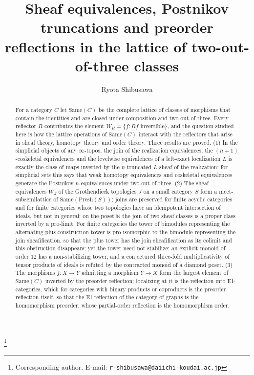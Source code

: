 \documentclass[11pt]{amsart}
\theoremstyle{definition}
\newcommand{\Same}{\mathrm{Same}}
\newcommand{\Presh}{\mathrm{Presh}}
\begin{document}
\title[Sheaves, truncations and reflections in the sameness lattice]{Sheaf equivalences, Postnikov truncations and preorder reflections in the lattice of two-out-of-three classes}
\author{Ryota Shibusawa}
\thanks{Corresponding author. E-mail: \texttt{r-shibusawa@daiichi-koudai.ac.jp}}
\address{Daiichi Institute of Technology}

\begin{abstract}
For a category $C$ let $\Same(C)$ be the complete lattice of classes of
morphisms that contain the identities and are closed under composition and
two-out-of-three. Every reflector $R$ contributes the element
$W_R=\{f:Rf\text{ invertible}\}$, and the question studied here is how the
lattice operations of $\Same(C)$ interact with the reflectors that arise in
sheaf theory, homotopy theory and order theory. Three results are proved.
(1) In the simplicial objects of any $\infty$-topos, the join of the
realization equivalences, the $(n{+}1)$-coskeletal equivalences and the
levelwise equivalences of a left-exact localization $L$ is exactly the class of
maps inverted by the $n$-truncated $L$-sheaf of the realization; for
simplicial sets this says that weak homotopy equivalences and coskeletal
equivalences generate the Postnikov $n$-equivalences under two-out-of-three.
(2) The sheaf equivalences $W_J$ of the Grothendieck topologies $J$ on a small
category $S$ form a meet-subsemilattice of $\Same(\Presh(S))$; joins are
preserved for finite acyclic categories and for finite categories whose two
topologies have an idempotent intersection of ideals, but not in general: on the
poset $\mathbb N$ the join of two sheaf classes is a proper class inverted by a
pro-limit. For finite categories the tower of bimodules representing the
alternating plus-construction tower is pro-isomorphic to the bimodule
representing the join sheafification, so that the plus tower has the join
sheafification as its colimit and this obstruction disappears; yet the tower
need not stabilize: an explicit monoid of order $12$
has a non-stabilizing tower, and a conjectured three-fold multiplicativity of
tensor products of ideals is refuted by the contracted monoid of a diamond
poset. (3) The morphisms $f\colon X\to Y$ admitting a morphism $Y\to X$ form the
largest element of $\Same(C)$ inverted by the preorder reflection; localizing
at it is the reflection into EI-categories, which for categories with binary
products or coproducts is the preorder reflection itself, so that the
EI-reflection of the category of graphs is the homomorphism preorder, whose
partial-order reflection is the homomorphism order.
\end{abstract}
\end{document}
